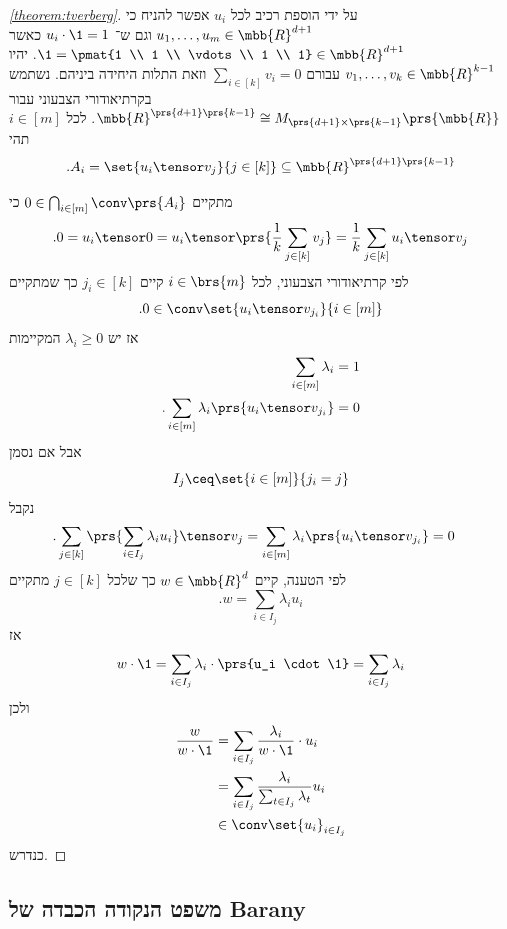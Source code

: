 \documentclass[a4paper,10pt,twoside,openany]{book}
\begin{document}
\begin{proof}[\ref{theorem:tverberg}]
על ידי הוספת רכיב לכל
$u_i$
אפשר להניח כי
$u_1, \ldots, u_m \in \mbb{R}^{d+1}$
וגם ש־%
$u_i \cdot \1 = 1$
כאשר
$\1 = \pmat{1 \\ 1 \\ \vdots \\ 1 \\ 1} \in \mbb{R}^{d+1}$.
יהיו
$v_1, \ldots, v_k \in \mbb{R}^{k-1}$
עבורם
$\sum_{i \in [k]} v_i = 0$
וזאת התלות היחידה ביניהם.
נשתמש בקרתיאודורי הצבעוני עבור
$\mbb{R}^{\prs{d+1}\prs{k-1}} \cong M_{\prs{d+1} \times \prs{k-1}}\prs{\mbb{R}}$.
לכל
$i \in [m]$
תהי
\[\text{.} A_i = \set{u_i \tensor v_j}{j \in [k]} \subseteq \mbb{R}^{\prs{d+1}\prs{k-1}}\]

מתקיים
$0 \in \bigcap_{i \in [m]} \conv\prs{A_i}$
כי
\[\text{.} 0 = u_i \tensor 0 = u_i \tensor \prs{\frac{1}{k} \sum_{j \in [k]} v_j} = \frac{1}{k} \sum_{j \in [k]} u_i \tensor v_j\]
לפי קרתיאודורי הצבעוני, לכל
$i \in \brs{m}$
קיים
$j_i \in [k]$
כך שמתקיים
\[\text{.} 0 \in \conv\set{u_i \tensor v_{j_i}}{i \in [m]}\]
אז יש
$\lambda_i \geq 0$
המקיימות
\begin{align*}
\sum_{i \in [m]} \lambda_i &= 1 \\
\text{.} \sum_{i \in [m]} \lambda_i \prs{u_i \tensor v_{j_i}} &= 0
\end{align*}
אבל אם נסמן
\[I_j \ceq \set{i \in [m]}{j_i = j}\]
נקבל
\begin{align*}
\text{.}  \sum_{j \in [k]} \prs{\sum_{i \in I_j} \lambda_i u_i} \tensor v_j &= \sum_{i \in [m]} \lambda_i \prs{u_i \tensor v_{j_i}} = 0
\end{align*}
לפי הטענה, קיים
$w \in \mbb{R}^d$
כך שלכל
$j \in [k]$
מתקיים
\[\text{.} w = \sum_{i \in I_j} \lambda_i u_i\]
אז
\[w \cdot \1 = \sum_{i \in I_j} \lambda_i \cdot \prs{u_i \cdot \1} = \sum_{i \in I_j} \lambda_i\]
ולכן
\begin{align*}
\frac{w}{w \cdot \1} &= \sum_{i \in I_j} \frac{\lambda_i}{w \cdot \1} \cdot u_i
\\&= \sum_{i \in I_j} \frac{\lambda_i}{\sum_{t \in I_j} \lambda_t} u_i
\\&\in \conv\set{u_i}_{i \in I_j}
\end{align*}
כנדרש.
\end{proof}

\subsection{משפט הנקודה הכבדה של
\textenglish{Barany}}
\end{document}
